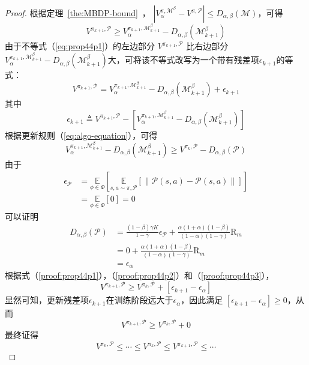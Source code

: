 \begin{proof}

根据定理~\ref{the:MBDP-bound}~， $\left|{V}_\alpha^{\pi, \mathcal{M}^\beta}-{V}^{\pi, \mathcal{P}}\right|\leq D_{\alpha,\beta}(\mathcal{M})$，可得
\begin{equation}\label{eq:prop44p1}
{V}^{\pi_{k+1}, \mathcal{P}} \geq {V}_{\alpha}^{\pi_{k+1}, \mathcal{M}_{k+1}^\beta}-D_{\alpha,\beta}(\mathcal{M}_{k+1}^\beta)
\end{equation}
由于不等式（\ref{eq:prop44p1}）的左边部分 ${V}^{\pi_{k+1}, \mathcal{P}}$ 比右边部分${V}_{\alpha}^{\pi_{k+1}, \mathcal{M}_{k+1}^\beta}-D_{\alpha,\beta}(\mathcal{M}_{k+1}^\beta)$大，可将该不等式改写为一个带有残差项$\epsilon_{k+1}$的等式：
\begin{equation}\label{proof:prop44p1}
{V}^{\pi_{k+1}, \mathcal{P}} = {V}_{\alpha}^{\pi_{k+1}, \mathcal{M}_{k+1}^\beta}-D_{\alpha,\beta}(\mathcal{M}_{k+1}^\beta) + \epsilon_{k+1}
\end{equation}
其中
\begin{equation}
\epsilon_{k+1} \triangleq {V}^{\pi_{k+1}, \mathcal{P}} - \left[{V}_{\alpha}^{\pi_{k+1}, \mathcal{M}_{k+1}^\beta} - D_{\alpha,\beta}(\mathcal{M}_{k+1}^\beta)\right]
\end{equation}
根据更新规则（\ref{eq:algo-equation}），可得
\begin{equation}\label{proof:prop44p2}
{V}_{\alpha}^{\pi_{k+1}, \mathcal{M}_{k+1}^\beta}-D_{\alpha,\beta}(\mathcal{M}_{k+1}^\beta) \geq {V}^{\pi_k,\mathcal{P}}-D_{\alpha,\beta}(\mathcal{P})
\end{equation}
由于
\begin{align}
\epsilon_{\mathcal{P}} &= \underset{\phi\in\Phi}{\mathbb{E}}\left[\underset{s,a\sim \pi,\mathcal{P}}{\mathbb{E}}\left[\left\|\mathcal{P}(s, a)-\mathcal{P}(s, a)\right\|\right]\right]\\
&=\underset{\phi\in\Phi}{\mathbb{E}}\left[0\right] = 0
\end{align}
可以证明
\begin{align}
D_{\alpha,\beta}(\mathcal{P}) &= \frac{(1-\beta)\gamma K}{1-\gamma}\epsilon_{\mathcal{P}}+\frac{\alpha(1+\alpha)(1-\beta)}{(1-\alpha)(1-\gamma)}\mathrm{R}_m\\
&=0+\frac{\alpha(1+\alpha)(1-\beta)}{(1-\alpha)(1-\gamma)}\mathrm{R}_m\\
&=\epsilon_\alpha \label{proof:prop44p3}
\end{align}
根据式（\ref{proof:prop44p1}），（\ref{proof:prop44p2}）和（\ref{proof:prop44p3}），
\begin{equation}
{V}^{\pi_{k+1}, \mathcal{P}}\geq {V}^{\pi_{k}, \mathcal{P}} + \left[\epsilon_{k+1} - \epsilon_\alpha\right]
\end{equation}
显然可知，更新残差项$\epsilon_{k+1}$在训练阶段远大于$\epsilon_\alpha$，因此满足 $\left[\epsilon_{k+1} - \epsilon_\alpha\right]\geq 0$，从而
\begin{equation}
{V}^{\pi_{k+1}, \mathcal{P}}\geq{V}^{\pi_{k}, \mathcal{P}}+0 
\end{equation}
最终证得
\begin{equation}
{V}^{\pi_{0}, \mathcal{P}} \leq \cdots \leq {V}^{\pi_{k}, \mathcal{P}} \leq {V}^{\pi_{k+1}, \mathcal{P}} \leq \cdots
\end{equation}


\end{proof}
